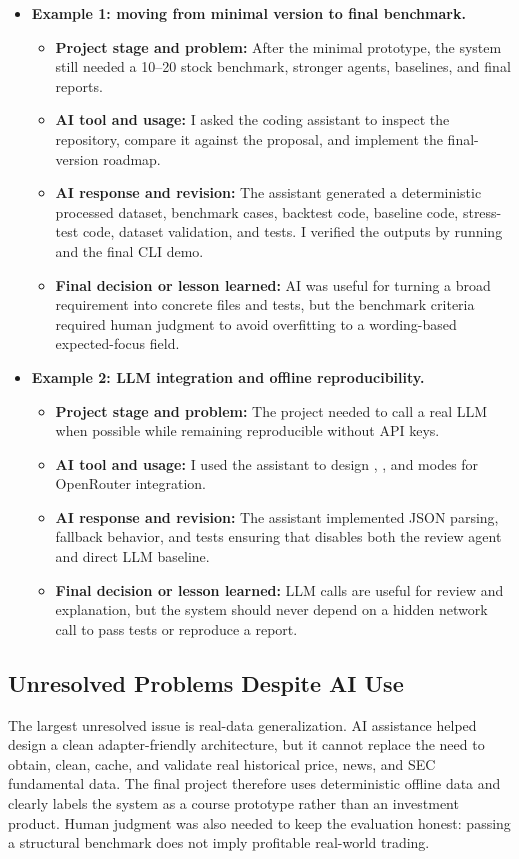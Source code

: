 \documentclass{article}
\newcommand{\codepath}[1]{\path{#1}}
\begin{document}
\begin{itemize}[leftmargin=*]
\item \textbf{Example 1: moving from minimal version to final benchmark.}
\begin{itemize}[leftmargin=*]
\item \textbf{Project stage and problem:} After the minimal prototype, the system still needed a 10--20 stock benchmark, stronger agents, baselines, and final reports.
\item \textbf{AI tool and usage:} I asked the coding assistant to inspect the repository, compare it against the proposal, and implement the final-version roadmap.
\item \textbf{AI response and revision:} The assistant generated a deterministic processed dataset, benchmark cases, backtest code, baseline code, stress-test code, dataset validation, and tests. I verified the outputs by running \codepath{unittest} and the final CLI demo.
\item \textbf{Final decision or lesson learned:} AI was useful for turning a broad requirement into concrete files and tests, but the benchmark criteria required human judgment to avoid overfitting to a wording-based expected-focus field.
\end{itemize}

\item \textbf{Example 2: LLM integration and offline reproducibility.}
\begin{itemize}[leftmargin=*]
\item \textbf{Project stage and problem:} The project needed to call a real LLM when possible while remaining reproducible without API keys.
\item \textbf{AI tool and usage:} I used the assistant to design \codepath{auto}, \codepath{required}, and \codepath{off} modes for OpenRouter integration.
\item \textbf{AI response and revision:} The assistant implemented JSON parsing, fallback behavior, and tests ensuring that \codepath{--llm off} disables both the review agent and direct LLM baseline.
\item \textbf{Final decision or lesson learned:} LLM calls are useful for review and explanation, but the system should never depend on a hidden network call to pass tests or reproduce a report.
\end{itemize}
\end{itemize}

\subsection{Unresolved Problems Despite AI Use}

The largest unresolved issue is real-data generalization. AI assistance helped design a clean adapter-friendly architecture, but it cannot replace the need to obtain, clean, cache, and validate real historical price, news, and SEC fundamental data. The final project therefore uses deterministic offline data and clearly labels the system as a course prototype rather than an investment product. Human judgment was also needed to keep the evaluation honest: passing a structural benchmark does not imply profitable real-world trading.
\end{document}
